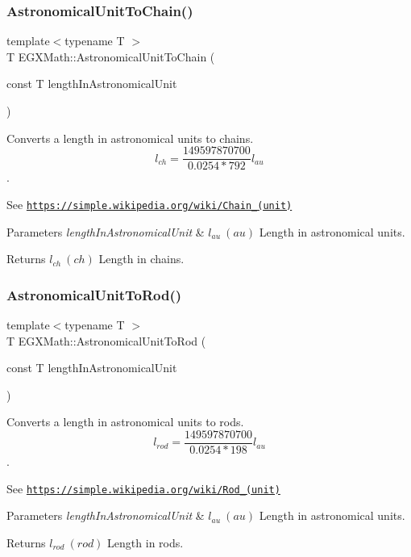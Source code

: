 \subsubsection{\texorpdfstring{Astronomical\+Unit\+To\+Chain()}{AstronomicalUnitToChain()}}
{\footnotesize\ttfamily template$<$typename T $>$ \\
T E\+G\+X\+Math\+::\+Astronomical\+Unit\+To\+Chain (\begin{DoxyParamCaption}\item[{const T}]{length\+In\+Astronomical\+Unit }\end{DoxyParamCaption})}



Converts a length in astronomical units to chains. \[ l_{ch}= \frac{149597870700}{0.0254 * 792} l_{au} \]. 

See \href{https://simple.wikipedia.org/wiki/Chain_(unit)}{\tt https\+://simple.\+wikipedia.\+org/wiki/\+Chain\+\_\+(unit)} 
\begin{DoxyParams}{Parameters}
{\em length\+In\+Astronomical\+Unit} & $ l_{au}\ (au)$ Length in astronomical units. \\
\hline
\end{DoxyParams}
\begin{DoxyReturn}{Returns}
$ l_{ch}\ (ch)$ Length in chains. 
\end{DoxyReturn}
\mbox{\label{group___e_g_x_math-_conversions-_length_conversions-_astronomical-_astronomical_unit-_surveyors_gab8120fd6b46c2eb849317bb948254c92}} 
\subsubsection{\texorpdfstring{Astronomical\+Unit\+To\+Rod()}{AstronomicalUnitToRod()}}
{\footnotesize\ttfamily template$<$typename T $>$ \\
T E\+G\+X\+Math\+::\+Astronomical\+Unit\+To\+Rod (\begin{DoxyParamCaption}\item[{const T}]{length\+In\+Astronomical\+Unit }\end{DoxyParamCaption})}



Converts a length in astronomical units to rods. \[ l_{rod}= \frac{149597870700}{0.0254 * 198} l_{au} \]. 

See \href{https://simple.wikipedia.org/wiki/Rod_(unit)}{\tt https\+://simple.\+wikipedia.\+org/wiki/\+Rod\+\_\+(unit)} 
\begin{DoxyParams}{Parameters}
{\em length\+In\+Astronomical\+Unit} & $ l_{au}\ (au)$ Length in astronomical units. \\
\hline
\end{DoxyParams}
\begin{DoxyReturn}{Returns}
$ l_{rod}\ (rod)$ Length in rods. 
\end{DoxyReturn}
